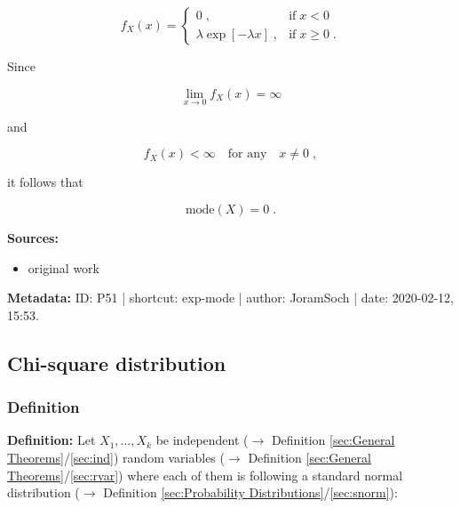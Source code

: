 \documentclass[a4paper,12pt,twoside]{book}
\begin{document}
\begin{equation} \label{eq:exp-mode-exp-pdf}
f_X(x) = \left\{
\begin{array}{rl}
0 \; , & \text{if} \; x < 0 \\
\lambda \exp[-\lambda x] \; , & \text{if} \; x \geq 0 \; .
\end{array}
\right.
\end{equation}

Since

\begin{equation} \label{eq:exp-mode-exp-pdf-eq0}
\lim_{x \to 0} f_X(x) = \infty
\end{equation}

and

\begin{equation} \label{eq:exp-mode-exp-pdf-neq0}
f_X(x) < \infty \quad \text{for any} \quad x \neq 0 \; ,
\end{equation}

it follows that

\begin{equation} \label{eq:exp-mode-exp-mode-qed}
\mathrm{mode}(X) = 0 \; .
\end{equation}


\vspace{1em}
\textbf{Sources:}
\begin{itemize}
\item original work\end{itemize}


\vspace{1em}
\textbf{Metadata:} ID: P51 | shortcut: exp-mode | author: JoramSoch | date: 2020-02-12, 15:53.
\vspace{1em}



\subsection{Chi-square distribution}

\subsubsection[\textit{Definition}]{Definition} \label{sec:chi2}
\setcounter{equation}{0}

\textbf{Definition:} Let $X_{1}, ..., X_{k}$ be independent ($\rightarrow$ Definition \ref{sec:General Theorems}/\ref{sec:ind}) random variables ($\rightarrow$ Definition \ref{sec:General Theorems}/\ref{sec:rvar}) where each of them is following a standard normal distribution ($\rightarrow$ Definition \ref{sec:Probability Distributions}/\ref{sec:snorm}):
\end{document}
